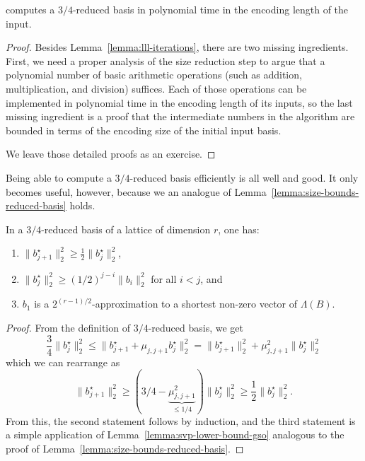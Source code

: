 \begin{theorem}
   computes a $3/4$-reduced basis in polynomial time
  in the encoding length of the input.
\end{theorem}
\begin{proof}
  Besides Lemma~\ref{lemma:lll-iterations},
  there are two missing ingredients.
  First, we need a proper analysis of the size reduction step to argue
  that a polynomial number of basic arithmetic operations (such as addition, multiplication, and division) suffices.
  Each of those operations can be implemented in polynomial time in the encoding length of its inputs,
  so the last missing ingredient is a proof that the intermediate numbers in the algorithm
  are bounded in terms of the encoding size of the initial input basis.

  We leave those detailed proofs as an exercise.
\end{proof}

Being able to compute a $3/4$-reduced basis efficiently is all well and good.
It only becomes useful, however, because we an analogue of Lemma~\ref{lemma:size-bounds-reduced-basis} holds.

\begin{lemma}
  \label{lemma:lll-reduced-properties}
  In a $3/4$-reduced basis of a lattice of dimension $r$, one has:
  \begin{enumerate}
    \item $\| b_{j+1}^\star \|_2^2 \geq \frac{1}{2} \|b_j^\star\|_2^2$,
    \item $\| b_j^\star \|_2^2 \geq (1/2)^{j-i} \|b_i\|_2^2$ for all $i < j$, and
    \item $b_1$ is a $2^{(r-1)/2}$-approximation to a shortest non-zero vector of $\Lambda(B)$.
  \end{enumerate}
\end{lemma}
\begin{proof}
  From the definition of $3/4$-reduced basis, we get
  \[
    \frac{3}{4} \|b_j^\star \|_2^2 \leq \| b_{j+1}^\star + \mu_{j,j+1} b_j^\star \|_2^2
      = \| b_{j+1}^\star \|_2^2 + \mu_{j,j+1}^2 \|b_j^\star\|_2^2
  \]
  which we can rearrange as
  \[
    \| b_{j+1}^\star \|_2^2 \geq (3/4 - \underbrace{\mu_{j,j+1}^2}_{\leq 1/4}) \|b_j^\star\|_2^2 \geq \frac{1}{2} \|b_j^\star\|_2^2.
  \]
  From this, the second statement follows by induction,
  and the third statement is a simple application of
  Lemma~\ref{lemma:svp-lower-bound-gso} analogous to the proof of Lemma~\ref{lemma:size-bounds-reduced-basis}.
\end{proof}







